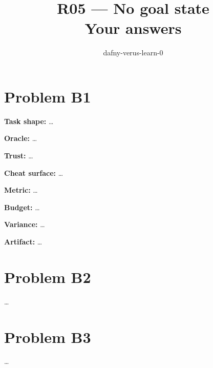 \documentclass[11pt]{article}
\title{R05 --- No goal state \\ \large Your answers}
\author{dafny-verus-learn-0}
\date{}
\begin{document}
\maketitle
\section*{Problem B1}\label{ans:B1}
\begin{answer}
\textbf{Task shape:} \dots

\textbf{Oracle:} \dots

\textbf{Trust:} \dots

\textbf{Cheat surface:} \dots

\textbf{Metric:} \dots

\textbf{Budget:} \dots

\textbf{Variance:} \dots

\textbf{Artifact:} \dots
\end{answer}
\section*{Problem B2}\label{ans:B2}
\begin{answer}
\dots
\end{answer}
\section*{Problem B3}\label{ans:B3}
\begin{answer}
\dots
\end{answer}
\end{document}
